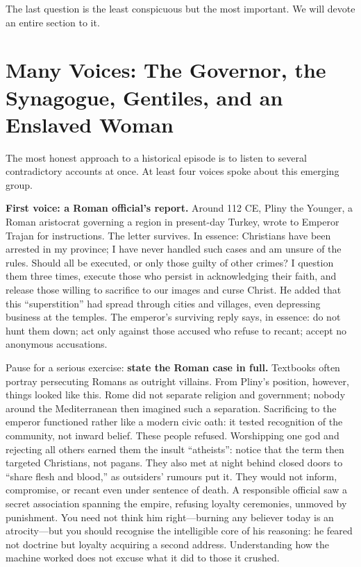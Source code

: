 The last question is the least conspicuous but the most important. We will devote an entire section to it.

\section[Governors, Synagogues, and Outsiders]{Many Voices: The Governor, the Synagogue, Gentiles, and an Enslaved Woman}
The most honest approach to a historical episode is to listen to several contradictory accounts at once. At least four voices spoke about this emerging group.

\textbf{First voice: a Roman official's report.} Around 112 CE, Pliny the Younger, a Roman aristocrat governing a region in present-day Turkey, wrote to Emperor Trajan for instructions. The letter survives. In essence: Christians have been arrested in my province; I have never handled such cases and am unsure of the rules. Should all be executed, or only those guilty of other crimes? I question them three times, execute those who persist in acknowledging their faith, and release those willing to sacrifice to our images and curse Christ. He added that this ``superstition'' had spread through cities and villages, even depressing business at the temples. The emperor's surviving reply says, in essence: do not hunt them down; act only against those accused who refuse to recant; accept no anonymous accusations.

Pause for a serious exercise: \textbf{state the Roman case in full.} Textbooks often portray persecuting Romans as outright villains. From Pliny's position, however, things looked like this. Rome did not separate religion and government; nobody around the Mediterranean then imagined such a separation. Sacrificing to the emperor functioned rather like a modern civic oath: it tested recognition of the community, not inward belief. These people refused. Worshipping one god and rejecting all others earned them the insult ``atheists'': notice that the term then targeted Christians, not pagans. They also met at night behind closed doors to ``share flesh and blood,'' as outsiders' rumours put it. They would not inform, compromise, or recant even under sentence of death. A responsible official saw a secret association spanning the empire, refusing loyalty ceremonies, unmoved by punishment. You need not think him right---burning any believer today is an atrocity---but you should recognise the intelligible core of his reasoning: he feared not doctrine but loyalty acquiring a second address. Understanding how the machine worked does not excuse what it did to those it crushed.

